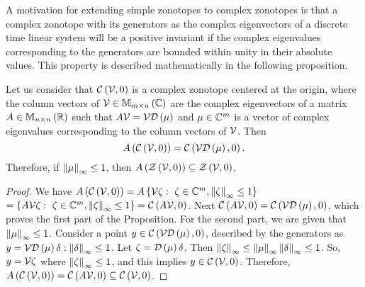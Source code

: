 A motivation for extending simple zonotopes to complex zonotopes is
that a complex zonotope with its generators as the complex
eigenvectors of a discrete time linear system will be a positive
invariant if the complex eigenvalues corresponding to the generators
are bounded within unity in their absolute values.  This property is
described mathematically in the following proposition.
%
\begin{proposition}
Let us consider that $\mathit{\mathcal{C}}\left(\mathcal{V},0\right)$ is a complex zonotope centered at
the origin, where the column vectors of $\mathcal{V}\in\mathbb{M}_{m\times n}\left(\mathbb{C}\right)$
are the complex eigenvectors of a matrix $A\in\mathbb{M}_{n\times n}\left(\mathbb{R}\right)$ such
that $A\mathcal{V} = \mathcal{V}\mathcal{D}\left(\mu\right)$ and $\mu\in\mathbb{C}^m$ is a vector of
complex eigenvalues corresponding to the column vectors of $\mathcal{V}$.
Then \[A\left(\mathit{\mathcal{C}}\left(\mathcal{V},0\right)\right) = \mathit{\mathcal{C}}\left(\mathcal{V}\mathcal{D}\left(\mu\right),0\right).\]
Therefore, if $\left\|\mu\right\|_{\infty}\leq 1$, then
$A\left(\mathit{\mathcal{Z}}\left(\mathcal{V},0\right)\right)\subseteq \mathit{\mathcal{Z}}\left(\mathcal{V},0\right)$.
\end{proposition}
% 
\begin{proof}
We have $A\left(\mathit{\mathcal{C}}\left(\mathcal{V},0\right)\right) =
A\left\{\mathcal{V}\zeta:~\zeta\in\mathbb{C}^m,\left\|\zeta\right\|_{\infty}\leq 1\right\}$\\
$=\left\{A\mathcal{V}\zeta:~\zeta\in\mathbb{C}^m,\left\|\zeta\right\|_{\infty}\leq 1\right\}
= \mathit{\mathcal{C}}\left(A\mathcal{V},0\right)$.  Next $\mathit{\mathcal{C}}\left(A\mathcal{V},0\right)
= \mathit{\mathcal{C}}\left(\mathcal{V}\mathcal{D}\left(\mu\right),0\right)$, which proves the first part of the
Proposition.  For the second part, we are given that
$\left\|\mu\right\|_{\infty}\leq 1$.  Consider a point $y\in \mathit{\mathcal{C}}\left(\mathcal{V}\mathcal{D}\left(\mu\right),0\right)$,
described by the generators as
$y = \mathcal{V}\mathcal{D}\left(\mu\right)\delta:\left\|\delta\right\|_{\infty}\leq 1$.
Let $\zeta = \mathcal{D}\left(\mu\right)\delta$. Then
$\left\|\zeta\right\|_{\infty} \leq \left\|\mu\right\|_{\infty}\left\|\delta\right\|_{\infty} \leq 1$.  So, 
$y=\mathcal{V}\zeta$ where $\left\|\zeta\right\|_{\infty}\leq 1$, and this implies $y\in \mathit{\mathcal{C}}\left(\mathcal{V},0\right)$.
Therefore, $A\left(\mathit{\mathcal{C}}\left(\mathcal{V},0\right)\right)=\mathit{\mathcal{C}}\left(A\mathcal{V},0\right)\subseteq \mathit{\mathcal{C}}\left(\mathcal{V},0\right)$.
\end{proof}
%
